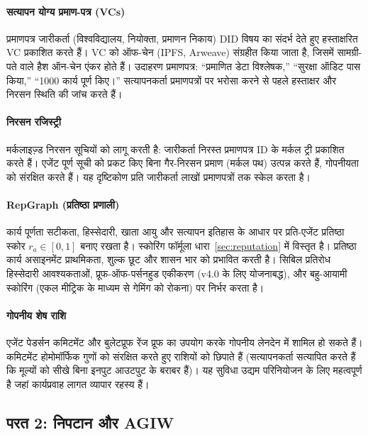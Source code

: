 \documentclass[11pt]{article}
\begin{document}
\paragraph{सत्यापन योग्य प्रमाण-पत्र (VCs)} प्रमाणपत्र जारीकर्ता (विश्वविद्यालय, नियोक्ता, प्रमाणन निकाय) DID विषय का संदर्भ देते हुए हस्ताक्षरित VC प्रकाशित करते हैं। VC को ऑफ-चेन (IPFS, Arweave) संग्रहीत किया जाता है, जिसमें सामग्री-पते वाले हैश ऑन-चेन एंकर होते हैं। उदाहरण प्रमाणपत्र: ``प्रमाणित डेटा विश्लेषक,'' ``सुरक्षा ऑडिट पास किया,'' ``1000 कार्य पूर्ण किए।'' सत्यापनकर्ता प्रमाणपत्रों पर भरोसा करने से पहले हस्ताक्षर और निरसन स्थिति की जांच करते हैं।

\paragraph{निरसन रजिस्ट्री} मर्कलाइज़्ड निरसन सूचियों को लागू करती है: जारीकर्ता निरस्त प्रमाणपत्र ID के मर्कल ट्री प्रकाशित करते हैं। एजेंट पूर्ण सूची को प्रकट किए बिना गैर-निरसन प्रमाण (मर्कल पथ) उत्पन्न करते हैं, गोपनीयता को संरक्षित करते हैं। यह दृष्टिकोण प्रति जारीकर्ता लाखों प्रमाणपत्रों तक स्केल करता है।

\paragraph{RepGraph (प्रतिष्ठा प्रणाली)} कार्य पूर्णता सटीकता, हिस्सेदारी, खाता आयु और सत्यापन इतिहास के आधार पर प्रति-एजेंट प्रतिष्ठा स्कोर $r_a \in [0,1]$ बनाए रखता है। स्कोरिंग फॉर्मूला धारा~\ref{sec:reputation} में विस्तृत है। प्रतिष्ठा कार्य असाइनमेंट प्राथमिकता, शुल्क छूट और शासन भार को प्रभावित करती है। सिबिल प्रतिरोध हिस्सेदारी आवश्यकताओं, प्रूफ-ऑफ-पर्सनहुड एकीकरण (v4.0 के लिए योजनाबद्ध), और बहु-आयामी स्कोरिंग (एकल मीट्रिक के माध्यम से गेमिंग को रोकना) पर निर्भर करता है।

\paragraph{गोपनीय शेष राशि} एजेंट पेडर्सन कमिटमेंट और बुलेटप्रूफ रेंज प्रूफ का उपयोग करके गोपनीय लेनदेन में शामिल हो सकते हैं। कमिटमेंट होमोमॉर्फिक गुणों को संरक्षित करते हुए राशियों को छिपाते हैं (सत्यापनकर्ता सत्यापित करते हैं कि मूल्यों को सीखे बिना इनपुट आउटपुट के बराबर हैं)। यह सुविधा उद्यम परिनियोजन के लिए महत्वपूर्ण है जहां कार्यप्रवाह लागत व्यापार रहस्य हैं।

\subsection{परत 2: निपटान और AGIW}
\end{document}
